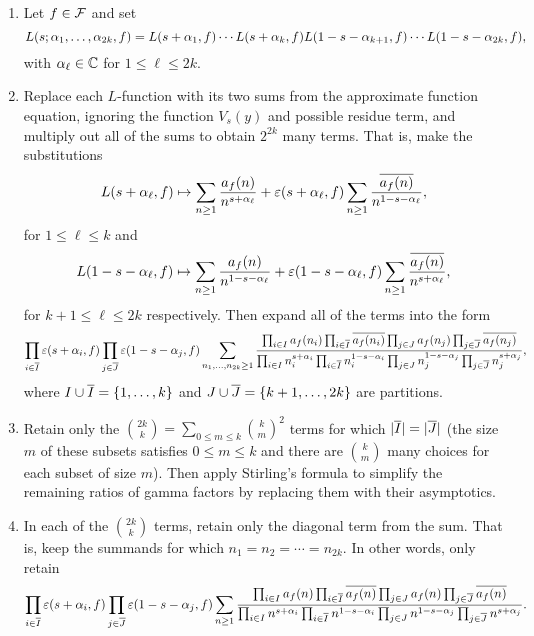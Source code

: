   \begin{enumerate}[label*=(\roman*)]
    \item Let $f \in \mathcal{F}$ and set
    \[
      L(s;\alpha_{1},\ldots,\alpha_{2k},f) = L(s+\alpha_{1},f) \cdots L(s+\alpha_{k},f)L(1-s-\alpha_{k+1},f) \cdots L(1-s-\alpha_{2k},f),
    \]
    with $\alpha_{\ell} \in \mathbb{C}$ for $1 \le \ell \le 2k$.
    \item Replace each $L$-function with its two sums from the approximate function equation, ignoring the function $V_{s}(y)$ and possible residue term, and multiply out all of the sums to obtain $2^{2k}$ many terms. That is, make the substitutions
    \[
      L(s+\alpha_{\ell},f) \mapsto \sum_{n \ge 1}\frac{a_{f}(n)}{n^{s+\alpha_{\ell}}}+\varepsilon(s+\alpha_{\ell},f)\sum_{n \ge 1}\frac{\overline{a_{f}(n)}}{n^{1-s-\alpha_{\ell}}},
    \]
    for $1 \le \ell \le k$ and
    \[
      L(1-s-\alpha_{\ell},f) \mapsto \sum_{n \ge 1}\frac{a_{f}(n)}{n^{1-s-\alpha_{\ell}}}+\varepsilon(1-s-\alpha_{\ell},f)\sum_{n \ge 1}\frac{\overline{a_{f}(n)}}{n^{s+\alpha_{\ell}}},
    \]
    for $k+1 \le \ell \le 2k$ respectively. Then expand all of the terms into the form
    \[
      \prod_{i \in \overline{I}}\varepsilon(s+\alpha_{i},f)\prod_{j \in \overline{J}}\varepsilon(1-s-\alpha_{j},f)\sum_{n_{1},\ldots,n_{2k} \ge 1}\frac{\prod_{i \in I}a_{f}(n_{i})\prod_{i \in \overline{I}}\overline{a_{f}(n_{i})}\prod_{j \in J}a_{f}(n_{j})\prod_{j \in \overline{J}}\overline{a_{f}(n_{j})}}{\prod_{i \in I}n_{i}^{s+\alpha_{i}}\prod_{i \in \overline{I}}n_{i}^{1-s-\alpha_{i}}\prod_{j \in J}n_{j}^{1-s-\alpha_{j}}\prod_{j \in \overline{J}}n_{j}^{s+\alpha_{j}}},
    \]
    where $I \cup \overline{I} = \{1,\ldots,k\}$ and $J \cup \overline{J} = \{k+1,\ldots,2k\}$ are partitions.
    \item Retain only the $\binom{2k}{k} = \sum_{0 \le m \le k}\binom{k}{m}^{2}$ terms for which $|\overline{I}| = |\overline{J}|$ (the size $m$ of these subsets satisfies $0 \le m \le k$ and there are $\binom{k}{m}$ many choices for each subset of size $m$). Then apply Stirling's formula to simplify the remaining ratios of gamma factors by replacing them with their asymptotics.
    \item In each of the $\binom{2k}{k}$ terms, retain only the diagonal term from the sum. That is, keep the summands for which $n_{1} = n_{2} = \cdots = n_{2k}$. In other words, only retain
    \[
      \prod_{i \in \overline{I}}\varepsilon(s+\alpha_{i},f)\prod_{j \in \overline{J}}\varepsilon(1-s-\alpha_{j},f)\sum_{n \ge 1}\frac{\prod_{i \in I}a_{f}(n)\prod_{i \in \overline{I}}\overline{a_{f}(n)}\prod_{j \in J}a_{f}(n)\prod_{j \in \overline{J}}\overline{a_{f}(n)}}{\prod_{i \in I}n^{s+\alpha_{i}}\prod_{i \in \overline{I}}n^{1-s-\alpha_{i}}\prod_{j \in J}n^{1-s-\alpha_{j}}\prod_{j \in \overline{J}}n^{s+\alpha_{j}}}.
\]
\end{enumerate}
